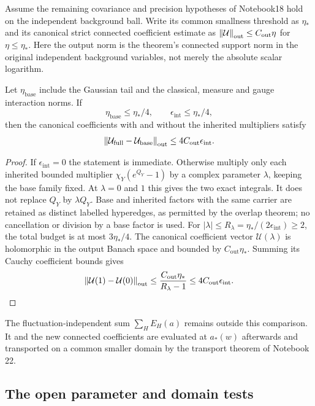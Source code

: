 Assume the remaining covariance and precision hypotheses of
Notebook18 hold on the independent background ball. Write its
common smallness threshold as $\eta_*$ and its canonical strict
connected coefficient estimate as
$\left\|\mathcal U\right\|_{\mathrm{out}}\le C_{\mathrm{out}}\eta$
for $\eta\le\eta_*$. Here the output norm is the theorem's
connected support norm in the original independent background
variables, not merely the absolute scalar logarithm.

\begin{corollary}
\label{qi-log-comparison}
Let $\eta_{\mathrm{base}}$ include the Gaussian tail and the
classical, measure and gauge interaction norms. If
\[
 \eta_{\mathrm{base}}\le\eta_*/4,
 \qquad\epsilon_{\mathrm{int}}\le\eta_*/4,
\]
then the canonical coefficients with and without the inherited
multipliers satisfy
\begin{equation}\label{qi-log-bound}
 \left\|\mathcal U_{\mathrm{full}}-
             \mathcal U_{\mathrm{base}}\right\|_{\mathrm{out}}
       \le4C_{\mathrm{out}}\epsilon_{\mathrm{int}}.
\end{equation}
\end{corollary}
\begin{proof}
If $\epsilon_{\mathrm{int}}=0$ the statement is immediate.
Otherwise multiply only each inherited bounded multiplier
$\chi_Y(e^{Q_Y}-1)$ by a complex parameter $\lambda$, keeping
the base family fixed. At $\lambda=0$ and $1$ this gives the
two exact integrals. It does not replace $Q_Y$ by $\lambda Q_Y$.
Base and inherited factors with the same carrier are retained
as distinct labelled hyperedges, as permitted by the overlap
theorem; no cancellation or division by a base factor is used.
For $|\lambda|\le R_\lambda=\eta_*/(2\epsilon_{\mathrm{int}})
\ge2$, the total budget is at most $3\eta_*/4$.
The canonical coefficient vector $\mathcal U(\lambda)$ is
holomorphic in the output Banach space and bounded by
$C_{\mathrm{out}}\eta_*$. Summing its Cauchy coefficient
bounds gives
\[
 \left\|\mathcal U(1)-\mathcal U(0)\right\|_{\mathrm{out}}
 \le\frac{C_{\mathrm{out}}\eta_*}{R_\lambda-1}
 \le4C_{\mathrm{out}}\epsilon_{\mathrm{int}}.
\]
\end{proof}
The fluctuation-independent sum $\sum_HE_H(a)$ remains outside
this comparison. It and the new connected coefficients are
evaluated at $a_*(w)$ afterwards and transported on a common
smaller domain by the transport theorem of Notebook 22.

\subsection{The open parameter and domain tests}

